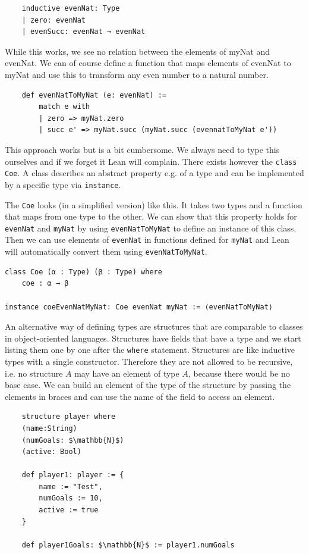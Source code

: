 \begin{lstlisting}
    inductive evenNat: Type
    | zero: evenNat
    | evenSucc: evenNat → evenNat
\end{lstlisting}

While this works, we see no relation between the elements of myNat and evenNat. We can of course define a function that maps elements of evenNat to myNat and use this to transform any even number to a natural number.

\begin{lstlisting}
    def evenNatToMyNat (e: evenNat) := 
        match e with
        | zero => myNat.zero
        | succ e' => myNat.succ (myNat.succ (evennatToMyNat e'))
\end{lstlisting}

This approach works but is a bit cumbersome. We always need to type this ourselves and if we forget it Lean will complain. There exists however the \lstinline|class Coe|. A class describes an abstract property e.g. of a type and can be implemented by a specific type via \lstinline|instance|.

The \lstinline|Coe| looks (in a simplified version) like this. It takes two types and a function that maps from one type to the other. We can show that this property holds for \lstinline|evenNat| and \lstinline|myNat| by using \lstinline|evenNatToMyNat| to define an instance of this class. Then we can use elements of \lstinline|evenNat| in functions defined for \lstinline|myNat| and Lean will automatically convert them using \lstinline|evenNatToMyNat|.

\begin{lstlisting}
class Coe (α : Type) (β : Type) where
    coe : α → β

instance coeEvenNatMyNat: Coe evenNat myNat := ⟨evenNatToMyNat⟩
\end{lstlisting}

An alternative way of defining types are structures that are comparable to classes in object-oriented languages. Structures have fields that have a type and we start listing them one by one after the \lstinline|where| statement. Structures are like inductive types with a single constructor. Therefore they are not allowed to be recursive, i.e. no structure $A$ may have an element of type $A$, because there would be no base case.
We can build an element of the type of the structure by passing the elements in braces and can use the name of the field to access an element.

\begin{lstlisting}
    structure player where
    (name:String)
    (numGoals: $\mathbb{N}$)
    (active: Bool)

    def player1: player := {
        name := "Test",
        numGoals := 10,
        active := true
    }

    def player1Goals: $\mathbb{N}$ := player1.numGoals
\end{lstlisting}

